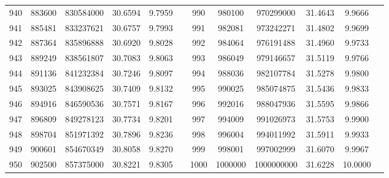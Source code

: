 \begin{longtable}{SSSSSSSSSSSS}
940&883600&830584000&30.6594&9.7959&&990&980100&970299000&31.4643&9.9666\\
941&885481&833237621&30.6757&9.7993&&991&982081&973242271&31.4802&9.9699\\
942&887364&835896888&30.6920&9.8028&&992&984064&976191488&31.4960&9.9733\\
943&889249&838561807&30.7083&9.8063&&993&986049&979146657&31.5119&9.9766\\
944&891136&841232384&30.7246&9.8097&&994&988036&982107784&31.5278&9.9800\\
945&893025&843908625&30.7409&9.8132&&995&990025&985074875&31.5436&9.9833\\
946&894916&846590536&30.7571&9.8167&&996&992016&988047936&31.5595&9.9866\\
947&896809&849278123&30.7734&9.8201&&997&994009&991026973&31.5753&9.9900\\
948&898704&851971392&30.7896&9.8236&&998&996004&994011992&31.5911&9.9933\\
949&900601&854670349&30.8058&9.8270&&999&998001&997002999&31.6070&9.9967\\
950&902500&857375000&30.8221&9.8305&&1000&1000000&1000000000&31.6228&10.0000\\
\end{longtable}
